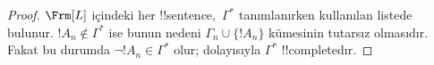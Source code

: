 \begin{proof}
$\Frm[L]$ içindeki her !!{sentence},~$\Gamma^*$ tanımlanırken kullanılan
listede bulunur. $!A_n\notin\Gamma^*$ ise bunun nedeni
$\Gamma_n\cup\{!A_n\}$ kümesinin tutarsız olmasıdır. Fakat bu durumda
$\lnot !A_n\in\Gamma^*$ olur; dolayısıyla $\Gamma^*$ !!{complete}{}dır.
\end{proof}

